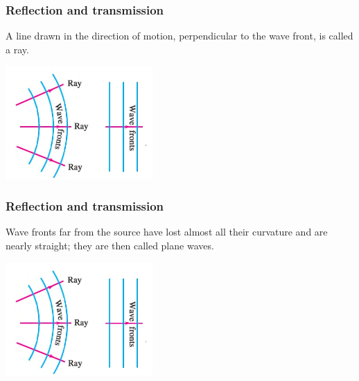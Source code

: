 \documentclass[]{beamer}
\begin{document}
  
  
  \begin{frame}
  \frametitle{Reflection and transmission }
  
  
  
  
  
  
  A line drawn in the direction of motion, perpendicular to the wave front, is called a ray.
  
  
  
    \begin{center}
    \includegraphics[height=1.7in]{images4/13.jpg}
  \end{center}
  
    \end{frame}
  
  
  
  
  
  \begin{frame}
  \frametitle{Reflection and transmission }
  
  
  
  
  Wave fronts far from the source have lost almost all their
  curvature  and are nearly straight; they are
  then called plane waves.
  
  
    \begin{center}
    \includegraphics[height=1.7in]{images4/13.jpg}
  \end{center}
  
    \end{frame}
\end{document}
